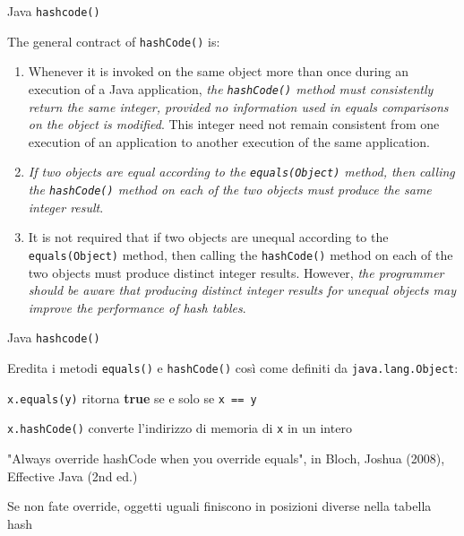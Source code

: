 \begin{frame}[shrink=10]{Java \texttt{hashcode()}}
	
\vspace{-6pt}
\begin{myboxtitle}
The general contract of \texttt{hashCode()} is:
\begin{enumerate}
\item Whenever it is invoked on the same object more than once during an
execution of a Java application, \alert{\emph{the \texttt{hashCode()} method must consistently return
the same integer, provided no information used in equals comparisons on the
object is modified}}. This integer need not remain consistent from one execution
of an application to another execution of the same application.
\item \alert{\emph{If two objects are equal according to the \texttt{equals(Object)} method, then
calling the \texttt{hashCode()} method on each of the two objects must produce the same
integer result}}.
\item It is not required that if two objects are unequal according to the
\texttt{equals(Object)} method, then calling the \texttt{hashCode()} method on each of
the two objects must produce distinct integer results. However, \alert{\emph{the programmer
should be aware that producing distinct integer results for unequal objects may
improve the performance of hash tables}}.
\end{enumerate}
\end{myboxtitle}

\end{frame}


\begin{frame}{Java \texttt{hashcode()}}

\vspace{-6pt}
\BIL
\item Eredita i metodi
\texttt{equals()} e \texttt{hashCode()} così come definiti da \texttt{java.lang.Object}:
\BI
\item \texttt{x.equals(y)}  ritorna \textbf{true} se e solo se \texttt{x == y}
\item \texttt{x.hashCode()} converte l'indirizzo di memoria di \texttt{x} in un intero
\EI
\EIL

\BIL
\item "Always override hashCode when you override equals", in Bloch, Joshua (2008), Effective Java (2nd ed.)
\item Se non fate override, oggetti uguali finiscono in posizioni diverse
nella tabella hash
\EIL

\end{frame}

